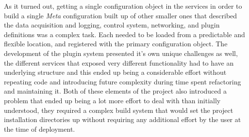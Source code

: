     As it turned out, getting a single configuration object in the services in
    order to build a single \emph{Meta} configuration built up of other smaller
    ones that described the data acquisition and logging, control system,
    networking, and plugin definitions was a complex task. Each needed to be
    loaded from a predictable and flexible location, and registered with the
    primary configuration object. The development of the plugin system presented
    it's own unique challenges as well, the different services that exposed very
    different functionality had to have an underlying structure and this ended
    up being a considerable effort without repeating code and introducing future
    complexity during time spent refactoring and maintaining it. Both of these
    elements of the project also introduced a problem that ended up being a lot
    more effort to deal with than initially understood, they required a complex
    build system that would set the project installation directories up without
    requiring any additional effort by the user at the time of deployment.
